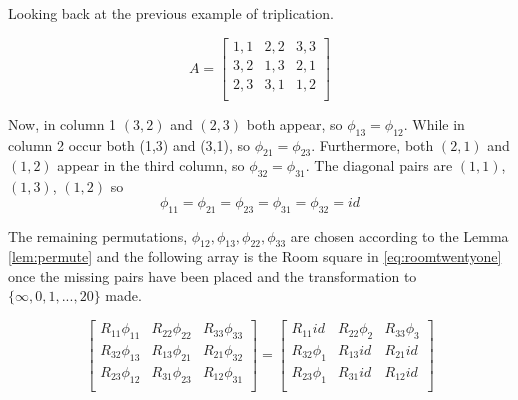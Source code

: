 \documentclass[
  11pt,
  a4paper]{book}\usepackage[]{graphicx}\usepackage[]{xcolor}
\newcounter{example}
\begin{document}
\begin{example}
Looking back at the previous example of triplication.

\begin{equation}
 A = \begin{bmatrix}
  1,1 & 2,2 & 3,3 \\
  3,2 & 1,3 & 2,1 \\
  2,3 & 3,1 & 1,2 \\
 \end{bmatrix}
\end{equation}

Now, in column 1 $(3, 2)$ and $(2, 3)$ both appear, so
$\phi _{13} = \phi _{12}$.
While in column 2 occur both (1,3) and
(3,1), so $\phi _{21} = \phi _{23}$.
Furthermore, both $(2, 1)$ and $(1, 2)$ appear in the third
column, so $\phi _{32} = \phi _{31}$.
The diagonal pairs are $(1, 1)$, $(1, 3)$, $(1, 2)$ so
\begin{equation}
\phi _{11} = \phi _{21} = \phi _{23} = \phi _{31} = \phi _{32} = id
\end{equation}

The remaining permutations,
$\phi _{12}, \phi _{13}, \phi _{22}, \phi _{33}$ are chosen
according to the Lemma \ref{lem:permute}
and the following array is the Room square in \ref{eq:roomtwentyone} once
the missing pairs have been placed and the transformation to
$\{\infty, 0, 1, ..., 20\}$ made.

\begin{equation}
  \begin{bmatrix}
   R_{11}\phi_{11} & R_{22}\phi_{22} & R_{33}\phi_{33} \\
   R_{32}\phi_{13} & R_{13}\phi_{21} & R_{21}\phi_{32} \\
   R_{23}\phi_{12} & R_{31}\phi_{23} & R_{12}\phi_{31} \\
  \end{bmatrix}
  =
  \begin{bmatrix}
      R_{11}id    & R_{22}\phi_{2} & R_{33}\phi_{3} \\
   R_{32}\phi_{1} &   R_{13}id     &    R_{21}id    \\
   R_{23}\phi_{1} &   R_{31}id     &    R_{12}id    \\
  \end{bmatrix}
\end{equation}

\end{example}
    

\chapter{}
\end{document}
